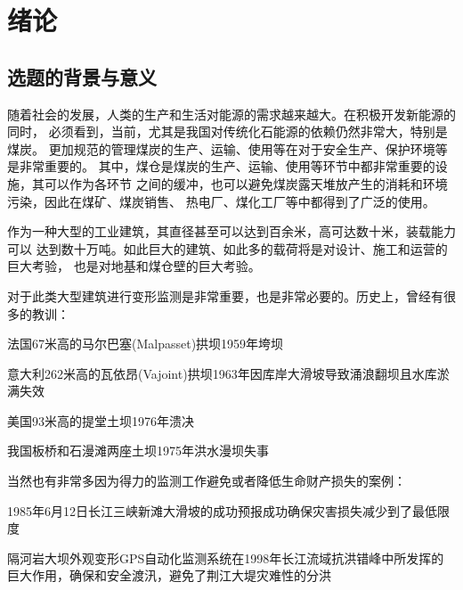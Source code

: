 
\chapter{绪论}
\label{chap00}

\section{选题的背景与意义}
随着社会的发展，人类的生产和生活对能源的需求越来越大。在积极开发新能源的同时，
必须看到，当前，尤其是我国对传统化石能源的依赖仍然非常大，特别是煤炭。
更加规范的管理煤炭的生产、运输、使用等在对于安全生产、保护环境等是非常重要的。
其中，煤仓是煤炭的生产、运输、使用等环节中都非常重要的设施，其可以作为各环节
之间的缓冲，也可以避免煤炭露天堆放产生的消耗和环境污染，因此在煤矿、煤炭销售、
热电厂、煤化工厂等中都得到了广泛的使用。

作为一种大型的工业建筑，其直径甚至可以达到百余米，高可达数十米，装载能力可以
达到数十万吨。如此巨大的建筑、如此多的载荷将是对设计、施工和运营的巨大考验，
也是对地基和煤仓壁的巨大考验。

对于此类大型建筑进行变形监测是非常重要，也是非常必要的。历史上，曾经有很多的教训：
\begin{asparaitem}[$\bullet$]
\item 法国67米高的马尔巴塞(Malpasset)拱坝1959年垮坝
\item 意大利262米高的瓦依昂(Vajoint)拱坝1963年因库岸大滑坡导致涌浪翻坝且水库淤满失效
\item 美国93米高的提堂土坝1976年溃决
\item 我国板桥和石漫滩两座土坝1975年洪水漫坝失事
\end{asparaitem}
当然也有非常多因为得力的监测工作避免或者降低生命财产损失的案例：
\begin{asparaitem}[$\bullet$]
\item 1985年6月12日长江三峡新滩大滑坡的成功预报成功确保灾害损失减少到了最低限度
\item 隔河岩大坝外观变形GPS自动化监测系统在1998年长江流域抗洪错峰中所发挥的巨大作用，确保和安全渡汛，避免了荆江大堤灾难性的分洪
\end{asparaitem}

